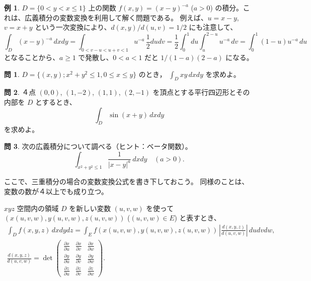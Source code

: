 \documentclass[a4paper]{jsarticle}
\theoremstyle{definition}
\newtheorem{Example}[Theorem]{例}
\newtheorem{Exercise}{問}%
\theoremstyle{remark}
\begin{document}
\begin{Example}
  $D = \{ 0 < y < x \leq 1\}$ 上の関数 $f(x,y) = (x-y)^{-a}$ ($a>0$) の積分。これは、広義積分の変数変換を利用して解く問題である。
  例えば、$u = x-y$, $v = x+y$ という一次変換により、$d(x,y)/d(u,v) = 1/2$ にも注意して、
  \[
    \int_D (x-y)^{-a}\, dxdy = \int_{0 < v-u < u+v < 1} u^{-a}\, \frac{1}{2} dudv
    = \frac{1}{2} \int_0^1 du \int_u^{2-u} u^{-a}\, dv = \int_0^1 (1-u)u^{-a}\, du 
  \]
 となることから、$a \geq 1$ で発散し、$0 < a < 1$ だと $1/(1-a)(2-a)$ になる。 
\end{Example}

\begin{Exercise}
$D = \{ (x,y); x^2 + y^2 \leq 1, 0 \leq x \leq y\}$ のとき，
$\displaystyle 
\int_D xy\, dxdy
$
を求めよ。
\end{Exercise}

\begin{Exercise}
４点 $(0,0)$, $(1,-2)$, $(1,1)$, $(2,-1)$ を頂点とする平行四辺形とその内部を $D$ とするとき、
\[
\int_D \sin(x+y)\, dxdy 
\]
を求めよ。
\end{Exercise}

\begin{Exercise}
  次の広義積分について調べる（ヒント：ベータ関数）。
  \[
    \int_{x^2+y^2 \leq 1} \frac{1}{|x-y|^a}\, dxdy
    \quad
    (a>0).
  \]
\end{Exercise}

ここで、三重積分の場合の変数変換公式を書き下しておこう。
同様のことは、変数の数が４以上でも成り立つ。

$xyz$ 空間内の領域 $D$ を新しい変数 $(u,v,w)$ を使って
$(x(u,v,w),y(u,v,w),z(u,v,w))$ ($(u,v,w) \in E$) と表すとき、
\begin{gather*}
\int_D f(x,y,z)\, dxdydz = \int_E f(x(u,v,w),y(u,v,w),z(u,v,w))\, 
\left|
\frac{d(x,y,z)}{d(u,v,w)} 
\right|\, dudvdw,\\
\frac{d(x,y,z)}{d(u,v,w)} = 
\det
\begin{pmatrix}
\frac{\partial x}{\partial u} & \frac{\partial x}{\partial v} & \frac{\partial x}{\partial w}\\
\frac{\partial y}{\partial u} & \frac{\partial y}{\partial v} & \frac{\partial y}{\partial w}\\
\frac{\partial z}{\partial u} & \frac{\partial z}{\partial v} & \frac{\partial z}{\partial w} 
\end{pmatrix}. 
\end{gather*} 
\end{document}
